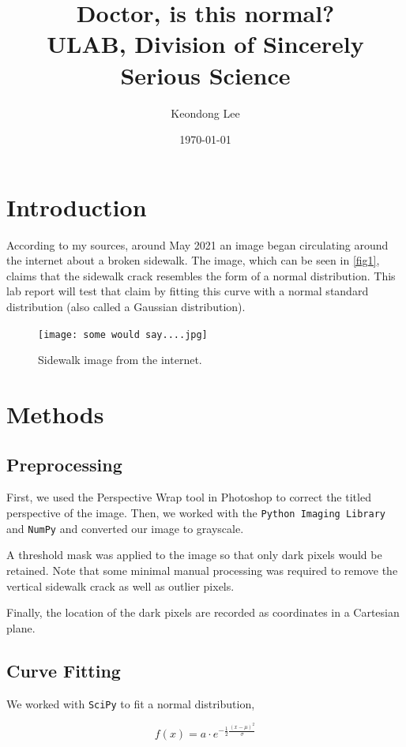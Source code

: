 \documentclass{article}
\title{Doctor, is this normal?\\
\large{ULAB, Division of Sincerely Serious Science}}
\author{Keondong Lee}
\date{\today}
\begin{document}
\maketitle

\section{Introduction}
According to my sources, around May 2021 an image began circulating around the internet about a broken sidewalk. The image, which can be seen in \autoref{fig1}, claims that the sidewalk crack resembles the form of a normal distribution. This lab report will test that claim by fitting this curve with a normal standard distribution (also called a Gaussian distribution).

\begin{figure}[h]
    \centering
    \texttt{[image: some would say....jpg]}
    \caption{Sidewalk image from the internet.}
    \label{fig1}
\end{figure}

\section{Methods}
\subsection{Preprocessing}
First, we used the Perspective Wrap tool in Photoshop to correct the titled perspective of the image. Then, we worked with the \texttt{Python Imaging Library} and \texttt{NumPy} \cite{2020SciPy-NMeth} and converted our image to grayscale. 

A threshold mask was applied to the image so that only dark pixels would be retained. Note that some minimal manual processing was required to remove the vertical sidewalk crack as well as outlier pixels. 

Finally, the location of the dark pixels are recorded as coordinates in a Cartesian plane.

\subsection{Curve Fitting}
We worked with \texttt{SciPy} \cite{2020NumPy-Array} to fit a normal distribution,

\begin{equation}
    f(x)=a\cdot e^{-\frac{1}{2}\frac{(x-\mu)^2}{\sigma}}
\end{equation}
\end{document}
